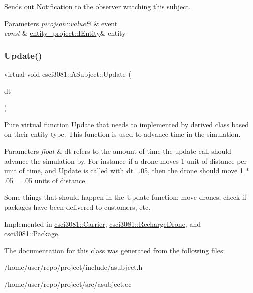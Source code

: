 Sends out Notification to the observer watching this subject. 


\begin{DoxyParams}{Parameters}
{\em picojson\+::value\&} & event \\
\hline
{\em const} & \hyperlink{classentity__project_1_1IEntity}{entity\+\_\+project\+::\+I\+Entity}\& entity \\
\hline
\end{DoxyParams}
\mbox{\label{classcsci3081_1_1ASubject_a04fdda736b2eb2784e5ef10d5f70dc7a}} 
\subsubsection{\texorpdfstring{Update()}{Update()}}
{\footnotesize\ttfamily virtual void csci3081\+::\+A\+Subject\+::\+Update (\begin{DoxyParamCaption}\item[{float}]{dt }\end{DoxyParamCaption})\hspace{0.3cm}{\ttfamily [pure virtual]}}



Pure virtual function Update that needs to implemented by derived class based on their entity type. This function is used to advance time in the simulation. 


\begin{DoxyParams}{Parameters}
{\em float} & dt refers to the amount of time the update call should advance the simulation by. For instance if a drone moves 1 unit of distance per unit of time, and Update is called with dt=.05, then the drone should move 1 $\ast$ .05 = .05 units of distance.\\
\hline
\end{DoxyParams}
Some things that should happen in the Update function\+: move drones, check if packages have been delivered to customers, etc. 

Implemented in \hyperlink{classcsci3081_1_1Carrier_a5f202411aa049586514a48129b959ed7}{csci3081\+::\+Carrier}, \hyperlink{classcsci3081_1_1RechargeDrone_ac4b45136e2969ac25941d46a8ccdb83a}{csci3081\+::\+Recharge\+Drone}, and \hyperlink{classcsci3081_1_1Package_acd1f198a6e087c08e1cfeed0f44a90be}{csci3081\+::\+Package}.



The documentation for this class was generated from the following files\+:\begin{DoxyCompactItemize}
\item 
/home/user/repo/project/include/asubject.\+h\item 
/home/user/repo/project/src/asubject.\+cc\end{DoxyCompactItemize}
